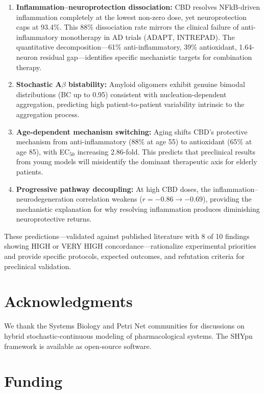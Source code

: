 \documentclass[10pt,letterpaper]{article}
\begin{document}
\begin{enumerate}
\item \textbf{Inflammation--neuroprotection dissociation:} CBD resolves NFkB-driven inflammation completely at the lowest non-zero dose, yet neuroprotection caps at 93.4\%. This 88\% dissociation rate mirrors the clinical failure of anti-inflammatory monotherapy in AD trials (ADAPT, INTREPAD). The quantitative decomposition---61\% anti-inflammatory, 39\% antioxidant, 1.64-neuron residual gap---identifies specific mechanistic targets for combination therapy.

\item \textbf{Stochastic A$\beta$ bistability:} Amyloid oligomers exhibit genuine bimodal distributions (BC up to 0.95) consistent with nucleation-dependent aggregation, predicting high patient-to-patient variability intrinsic to the aggregation process.

\item \textbf{Age-dependent mechanism switching:} Aging shifts CBD's protective mechanism from anti-inflammatory (88\% at age 55) to antioxidant (65\% at age 85), with EC$_{50}$ increasing 2.86-fold. This predicts that preclinical results from young models will misidentify the dominant therapeutic axis for elderly patients.

\item \textbf{Progressive pathway decoupling:} At high CBD doses, the inflammation--neurodegeneration correlation weakens ($r = -0.86 \to -0.69$), providing the mechanistic explanation for why resolving inflammation produces diminishing neuroprotective returns.
\end{enumerate}

These predictions---validated against published literature with 8 of 10 findings showing HIGH or VERY HIGH concordance---rationalize experimental priorities and provide specific protocols, expected outcomes, and refutation criteria for preclinical validation.

\section*{Acknowledgments}

We thank the Systems Biology and Petri Net communities for discussions on hybrid stochastic-continuous modeling of pharmacological systems. The SHYpn framework is available as open-source software.

\section*{Funding}
\end{document}

